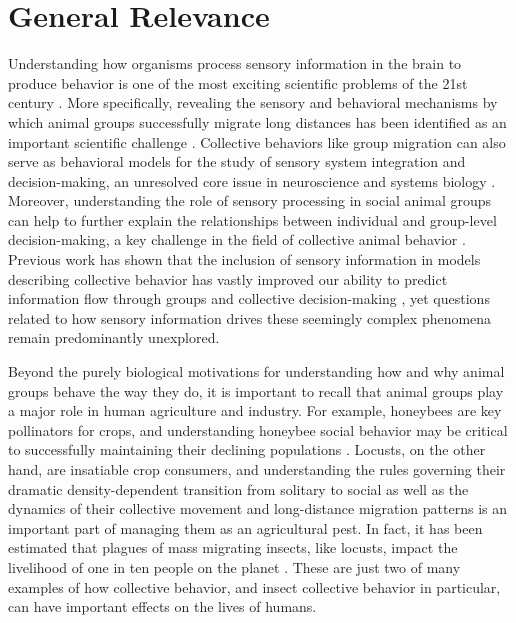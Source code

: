 \documentclass[11pt,a4paper,oneside]{article}
\begin{document}
	\section{General Relevance}
	\par
	Understanding how organisms process sensory information in the brain to produce behavior is one of the most exciting scientific problems of the 21st century \citep{anderson2014competho}. More specifically, revealing the sensory and behavioral mechanisms by which animal groups successfully migrate long distances has been identified as an important scientific challenge \citep{kennedy2005don,miller2005biological}. Collective behaviors like group migration can also serve as behavioral models for the study of sensory system integration and decision-making, an unresolved core issue in neuroscience and systems biology \citep{gold2007neural}. Moreover, understanding the role of sensory processing in social animal groups can help to further explain the relationships between individual and group-level decision-making, a key challenge in the field of collective animal behavior \citep{croft2008exploring,couzin2007collective}. Previous work has shown that the inclusion of sensory information in models describing collective behavior has vastly improved our ability to predict information flow through groups and collective decision-making \citep{bazazi2008collective,strandburg2013visual,strandburg2017habitat,rosenthal2015network,twomey2016vision}, yet questions related to how sensory information drives these seemingly complex phenomena remain predominantly unexplored.
	\par
	Beyond the purely biological motivations for understanding how and why animal groups behave the way they do, it is important to recall that animal groups play a major role in human agriculture and industry. For example, honeybees are key pollinators for crops, and understanding honeybee social behavior may be critical to successfully maintaining their declining populations \citep{vanbergen2013threats}. Locusts, on the other hand, are insatiable crop consumers, and understanding the rules governing their dramatic density-dependent transition from solitary to social  \citep{simpson2001gregarious} as well as the dynamics of their collective movement \citep{buhl2006disorder} and long-distance migration patterns \citep{kennedy1951migration} is an important part of managing them as an agricultural pest. In fact, it has been estimated that plagues of mass migrating insects, like locusts, impact the livelihood of one in ten people on the planet \citep{kennedy1985migration}. These are just two of many examples of how collective behavior, and insect collective behavior in particular, can have important effects on the lives of humans. 
\end{document}
